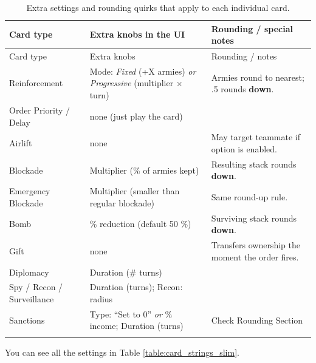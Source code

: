 \scriptsize
\begin{longtable}{|l|p{6.8cm}|p{3.6cm}|}
\hline
\rowcolor{Baby_Blue}
Card type & Extra knobs in the UI & Rounding / special notes \\ \hline\hline
\endfirsthead
\hline
\rowcolor{Baby_Blue}
Card type & Extra knobs & Rounding / notes \\ \hline\hline
\endhead
Reinforcement        & Mode: \emph{Fixed} (+X armies) \textit{or} \emph{Progressive} (multiplier × turn) & Armies round to nearest; .5 rounds \textbf{down}. \\ \hline
Order Priority / Delay & none (just play the card) & \\ \hline
Airlift              & none & May target teammate if option is enabled. \\ \hline
Blockade             & Multiplier (\% of armies kept) & Resulting stack rounds \textbf{down}. \\ \hline
Emergency Blockade   & Multiplier (smaller than regular blockade) & Same round-up rule. \\ \hline
Bomb                 & \% reduction (default 50 \%) & Surviving stack rounds \textbf{down}. \\ \hline
Gift                 & none & Transfers ownership the moment the order fires. \\ \hline
Diplomacy            & Duration (\# turns)          & \\ \hline
Spy / Recon / Surveillance & Duration (turns); Recon: radius &  \\ \hline
Sanctions            & Type: “Set to 0” \textit{or} \% income; Duration (turns) & Check Rounding Section \\ \hline
\caption{Extra settings and rounding quirks that apply to each individual card.}
\label{table:card_per_type}
\end{longtable}
\normalsize

You can see all the settings in Table \ref{table:card_strings_slim}.

